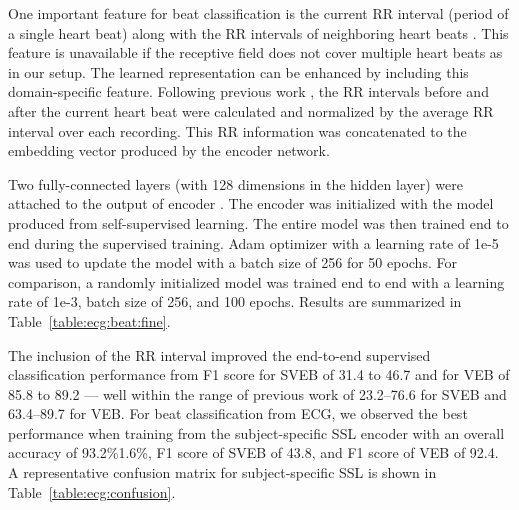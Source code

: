 \documentclass{article}
\begin{document}
One important feature for beat classification is the current RR interval (period
of a single heart beat) along with the RR intervals of neighboring heart beats
\cite{doquire_feature_2011,lin_heartbeat_2014}. This feature is unavailable if
the receptive field does not cover multiple heart beats as in our setup. The
learned representation can be enhanced by including this domain-specific
feature. Following previous work \cite{huang_new_2014,niu_inter-patient_2019},
the RR intervals before and after the current heart beat were calculated and
normalized by the average RR interval over each recording. This RR information
was concatenated to the embedding vector produced by the encoder network.

Two fully-connected layers (with 128 dimensions in the hidden layer) were
attached to the output of encoder . The encoder  was initialized with the
model produced from self-supervised learning. The entire model was then trained
end to end during the supervised training. Adam optimizer with a learning rate
of 1e-5 was used to update the model with a batch size of 256 for 50 epochs. For
comparison, a randomly initialized model was trained end to end with a learning
rate of 1e-3, batch size of 256, and 100 epochs. Results are summarized in
Table~\ref{table:ecg:beat:fine}.

The inclusion of the RR interval improved the end-to-end supervised
classification performance from F1 score for SVEB of 31.4 to 46.7 and for VEB of
85.8 to 89.2 --- well within the range of previous work
\cite{de_chazal_automatic_2004,huang_new_2014,garcia_inter-patient_2017,xu_towards_2019,niu_inter-patient_2019}
of 23.2--76.6 for SVEB and 63.4--89.7 for VEB. For beat classification from ECG,
we observed the best performance when training from the subject-specific SSL
encoder with an overall accuracy of 93.2\%1.6\%, F1 score of SVEB of 43.8,
and F1 score of VEB of 92.4. A representative confusion matrix for
subject-specific SSL is shown in Table~\ref{table:ecg:confusion}.
\end{document}
